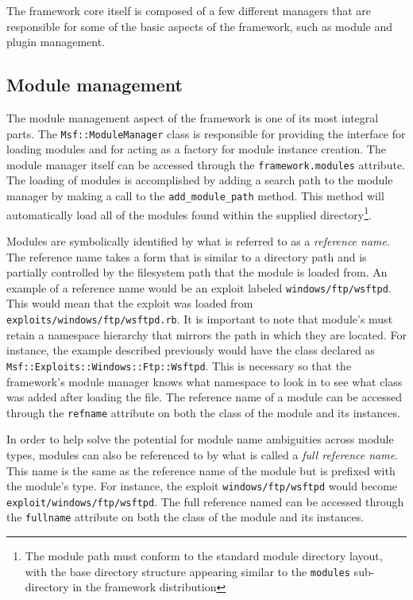 \documentclass{report}
\begin{document}
\par
The framework core itself is composed of a few different managers
that are responsible for some of the basic aspects of the framework,
such as module and plugin management.

        \subsection{Module management}

\par
The module management aspect of the framework is one of its most
integral parts.  The \texttt{Msf::ModuleManager} class is
responsible for providing the interface for loading modules and for
acting as a factory for module instance creation.  The module
manager itself can be accessed through the
\texttt{framework.modules} attribute.  The loading of modules is
accomplished by adding a search path to the module manager by making
a call to the \texttt{add\_module\_path} method.  This method will
automatically load all of the modules found within the supplied
directory\footnote{The module path must conform to the standard
module directory layout, with the base directory structure appearing
similar to the \texttt{modules} sub-directory in the framework
distribution}.

\par
Modules are symbolically identified by what is referred to as a
\textit{reference name}.  The reference name takes a form that is
similar to a directory path and is partially controlled by the
filesystem path that the module is loaded from.  An example of a
reference name would be an exploit labeled
\texttt{windows/ftp/wsftpd}.  This would mean that the exploit was
loaded from \texttt{exploits/windows/ftp/wsftpd.rb}.  It is
important to note that module's must retain a namespace hierarchy
that mirrors the path in which they are located.  For instance, the
example described previously would have the class declared as
\texttt{Msf::Exploits::Windows::Ftp::Wsftpd}.  This is necessary so
that the framework's module manager knows what namespace to look in
to see what class was added after loading the file.  The reference
name of a module can be accessed through the \texttt{refname}
attribute on both the class of the module and its instances.

\par
In order to help solve the potential for module name ambiguities
across module types, modules can also be referenced to by what is
called a \textit{full reference name}.  This name is the same as the
reference name of the module but is prefixed with the module's type.
For instance, the exploit \texttt{windows/ftp/wsftpd} would become
\texttt{exploit/windows/ftp/wsftpd}.  The full reference named can
be accessed through the \texttt{fullname} attribute on both the
class of the module and its instances.
\end{document}
